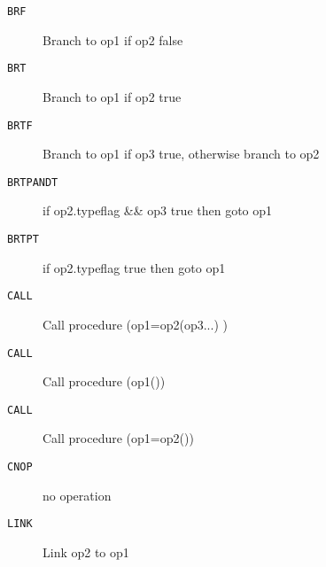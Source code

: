 
\begin{description}
\item[\texttt{BRF        }]  Branch to op1 if op2 false\\
\end{description}

\begin{description}
\item[\texttt{BRT        }]  Branch to op1 if op2 true\\
\end{description}

\begin{description}
\item[\texttt{BRTF       }]  Branch to op1 if op3 true, otherwise branch to op2\\
\end{description}

\begin{description}
\item[\texttt{BRTPANDT   }]  if op2.typeflag \&\& op3 true then goto op1\\
\end{description}

\begin{description}
\item[\texttt{BRTPT      }]  if op2.typeflag true then goto op1\\
\end{description}

\begin{description}
\item[\texttt{CALL       }]  Call procedure (op1=op2(op3...) )\\
\end{description}

\begin{description}
\item[\texttt{CALL       }]  Call procedure (op1())\\
\end{description}

\begin{description}
\item[\texttt{CALL       }]  Call procedure (op1=op2())\\
\end{description}

\begin{description}
\item[\texttt{CNOP       }]  no operation\\
\end{description}

\begin{description}
\item[\texttt{LINK       }]  Link op2 to op1\\
\end{description}
